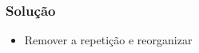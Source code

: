 \begin{frame}
	\frametitle{Solução}

	\begin{itemize}
		\item Remover a repetição e reorganizar
	\end{itemize}

\end{frame}
